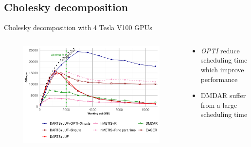 \documentclass{libs/ufc_format}
\newcommand{\OPTI}{\textit{OPTI}\xspace}
\begin{document}
\subsection{Cholesky decomposition}
\begin{frame}{Cholesky decomposition with 4 Tesla V100 GPUs}
    \begin{columns}{}
		\begin{column}{0.7\textwidth}
		\begin{figure}
			\center\includegraphics[scale = 0.45]{Images/GF_dynamic_data_aware_no_hfp_gemini-1-fgcs_4GPU.pdf}
		\end{figure}
		\end{column}
		\begin{column}{0.3\textwidth}
		\begin{itemize}
			\item \OPTI reduce scheduling time which improve performance
			\item DMDAR suffer from a large scheduling time
		\end{itemize}
		\end{column}
	\end{columns}
\end{frame}

\end{document}
